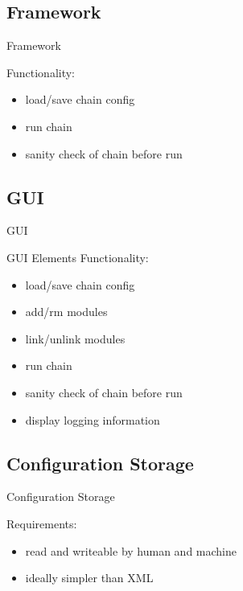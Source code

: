 \documentclass{beamer}
\begin{document}
\subsection{Framework}
\begin{frame}{Framework}

	Functionality:
	\begin{itemize}
		\item load/save chain config
		\item run chain
		\item sanity check of chain before run
	\end{itemize}

\end{frame}

\subsection{GUI}
\begin{frame}{GUI}

	GUI Elements
	Functionality:
	\begin{itemize}
		\item load/save chain config
		\item add/rm modules
 		\item link/unlink modules
  		\item run chain
	 	\item sanity check of chain before run
	 	\item display logging information
	\end{itemize}

\end{frame}

\subsection{Configuration Storage}
\begin{frame}{Configuration Storage}

	\Large
	Requirements:

	\vspace{1cm}
	\begin{itemize}
		\item read and writeable by human and machine
		\item ideally simpler than XML
	\end{itemize}


\end{frame}
\end{document}
